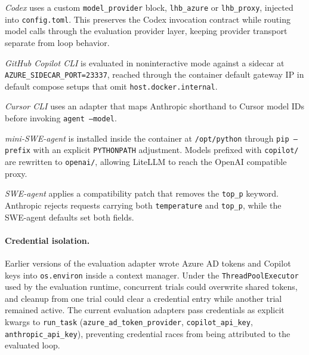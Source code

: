 \textit{Codex} uses a custom \texttt{model\_provider} block, \texttt{lhb\_azure} or \texttt{lhb\_proxy}, injected into \texttt{config.toml}. This preserves the Codex invocation contract while routing model calls through the evaluation provider layer, keeping provider transport separate from loop behavior.

\textit{GitHub Copilot CLI} is evaluated in noninteractive mode against a sidecar at \texttt{AZURE\_SIDECAR\_PORT=23337}, reached through the container default gateway IP in default compose setups that omit \texttt{host.docker.internal}.

\textit{Cursor CLI} uses an adapter that maps Anthropic shorthand to Cursor model IDs before invoking \texttt{agent --model}.

\textit{mini-SWE-agent} is installed inside the container at \texttt{/opt/python} through \texttt{pip --prefix} with an explicit \texttt{PYTHONPATH} adjustment. Models prefixed with \texttt{copilot/} are rewritten to \texttt{openai/}, allowing LiteLLM to reach the OpenAI compatible proxy.

\textit{SWE-agent} applies a compatibility patch that removes the \texttt{top\_p} keyword. Anthropic rejects requests carrying both \texttt{temperature} and \texttt{top\_p}, while the SWE-agent defaults set both fields.

\paragraph{Credential isolation.}

Earlier versions of the evaluation adapter wrote Azure AD tokens and Copilot keys into \texttt{os.environ} inside a context manager. Under the \texttt{ThreadPoolExecutor} used by the evaluation runtime, concurrent trials could overwrite shared tokens, and cleanup from one trial could clear a credential entry while another trial remained active. The current evaluation adapters pass credentials as explicit kwargs to \texttt{run\_task} (\texttt{azure\_ad\_token\_provider}, \texttt{copilot\_api\_key}, \texttt{anthropic\_api\_key}), preventing credential races from being attributed to the evaluated loop.
